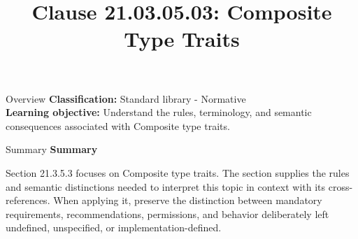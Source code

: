 \documentclass[10pt,letterpaper]{article}
\title{Clause 21.03.05.03: Composite Type Traits}
\author{}
\date{}
\begin{document}
\maketitle
\begin{CornellOverviewBox}{Overview}
\textbf{Classification:} Standard library - Normative\\[2pt]
\textbf{Learning objective:} Understand the rules, terminology, and semantic consequences associated with Composite type traits.
\end{CornellOverviewBox}\begin{CornellSummaryBox}{Summary}
{\sffamily\bfseries\color{Accent} Summary}\par\vspace{3pt}Section 21.3.5.3 focuses on Composite type traits. The section supplies the rules and semantic distinctions needed to interpret this topic in context with its cross-references. When applying it, preserve the distinction between mandatory requirements, recommendations, permissions, and behavior deliberately left undefined, unspecified, or implementation-defined.
\end{CornellSummaryBox}
\end{document}

